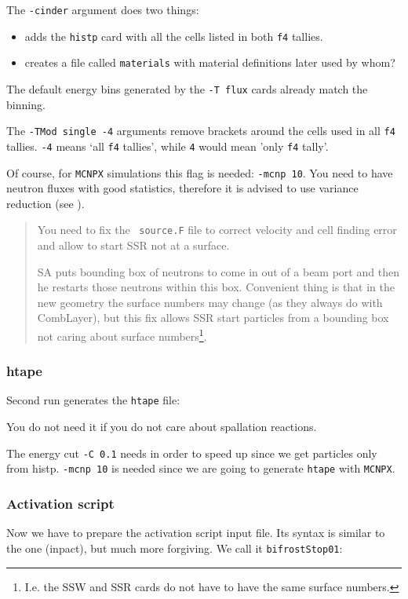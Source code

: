The {\tt -cinder} argument does two things:
\begin{itemize}
\item adds the {\tt histp} card with all the cells listed in both {\tt f4} tallies.
\item creates a file called {\tt materials} with material definitions later used by \alert{whom}?
\end{itemize}
The default energy bins generated by the {\tt -T flux} cards already match the \cinder binning.

The {\tt -TMod single -4} arguments remove brackets around the cells used in all {\tt f4} tallies.
{\tt -4} means `all {\tt f4} tallies', while
{\tt 4} would mean 'only {\tt f4} tally'.

Of course, for {\tt MCNPX} simulations this flag is needed: {\tt -mcnp 10}.
You need to have neutron fluxes with good statistics, therefore it is advised to use variance reduction (see ).

\begin{quote}
You need to fix the \mcnp\ {\tt source.F} file to correct velocity and cell finding error and allow to start SSR not at a surface.

SA puts bounding box of neutrons to come in out of a beam port and then he restarts those neutrons within this box.
Convenient thing is that in the new geometry the surface numbers may change (as they always do with CombLayer), but
this fix allows SSR start particles from a bounding box not caring about surface numbers\footnote{I.e. the SSW and SSR cards do not have to have the same surface numbers.}.
\end{quote}

\subsubsection{htape}
Second run generates the {\tt htape} file:

You do not need it if you do not care about spallation reactions.

The energy cut {\tt -C 0.1} needs in order to speed up since we get particles only from histp.
{\tt -mcnp 10} is needed since we are going to generate {\tt htape} with {\tt MCNPX}.

\subsubsection{Activation script}
Now we have to prepare the activation script input file. Its syntax is similar to the \cinder one (inpact), but much more forgiving.
We call it {\tt bifrostStop01}:


